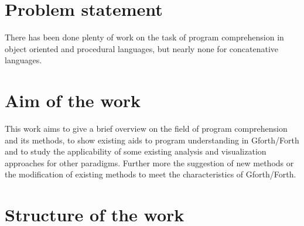 \begin{comment}
\hl{mental model(LaToza et al., 2006) read: ..comment}
\@inproceedings\{Lieberman:1995:BGC:223904.223969,
author = \{Lieberman, Henry and Fry, Christopher\},
title = \{Bridging the Gulf Between Code and Behavior in Programming\},
booktitle = \{Proceedings of the SIGCHI Conference on Human Factors in Computing Systems\},
series = \{CHI '95\},
year = \{1995\},
isbn = \{0-201-84705-1\},
location = \{Denver, Colorado, USA\},
pages = \{480--486\},
numpages = \{7\},
url = \{http://dx.doi.org/10.1145/223904.223969\},
doi = \{10.1145/223904.223969\},
acmid = \{223969\},
publisher = \{ACM Press/Addison-Wesley Publishing Co.\},
address = \{New York, NY, USA\},
\}
\end{comment}


\section*{Problem statement}

There has been done plenty of work on the task of program comprehension in object oriented and procedural languages\cite{Cornelissen:2009:SSP:1638616.1639301}, but nearly none for concatenative languages. \begin{comment} The qualitative exploratory approach of this thesis does not encourage the formulation of specific hypothesis. Therefore the first question, is the applicability of existing methods and their visualization techniques. The second question to be answered, concerns new approaches, which may be exclusive to concatenative languages or Gforth/Forth.\end{comment}

\section*{Aim of the work}

This work aims to give a brief overview on the field of program comprehension and its methods, to show existing aids to program understanding in Gforth/Forth and to study the applicability of some existing analysis and visualization approaches for other paradigms. Further more the suggestion of new methods or the modification of existing methods to meet the characteristics of Gforth/Forth.

\section*{Structure of the work}

